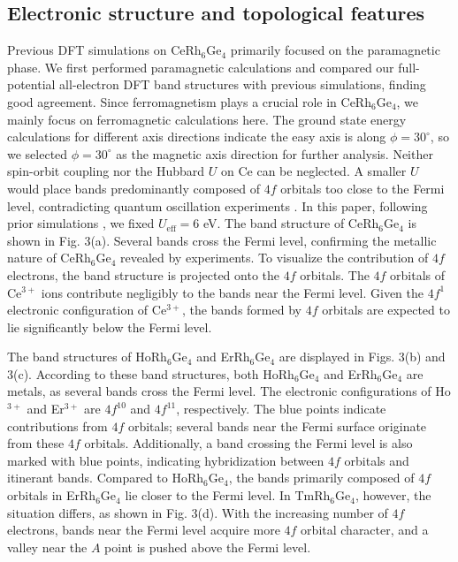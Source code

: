 \documentclass[preprint,12pt]{elsarticle}
\begin{document}
\subsection{Electronic structure and topological features}

Previous DFT simulations on CeRh$_6$Ge$_4$ primarily focused on the paramagnetic phase. We first performed paramagnetic calculations and compared our full-potential all-electron DFT band structures with previous simulations, finding good agreement. Since ferromagnetism plays a crucial role in CeRh$_6$Ge$_4$, we mainly focus on ferromagnetic calculations here. The ground state energy calculations for different axis directions indicate the easy axis is along $\phi = 30^\circ$, so we selected $\phi = 30^\circ$ as the magnetic axis direction for further analysis. Neither spin-orbit coupling nor the Hubbard $U$ on Ce can be neglected. A smaller $U$ would place bands predominantly composed of $4f$ orbitals too close to the Fermi level, contradicting quantum oscillation experiments \cite{wang2021localized}. In this paper, following prior simulations \cite{wu2021anisotropic}, we fixed $U_{\text{eff}} = 6$ eV. The band structure of CeRh$_6$Ge$_4$ is shown in Fig. 3(a). Several bands cross the Fermi level, confirming the metallic nature of CeRh$_6$Ge$_4$ revealed by experiments. To visualize the contribution of $4f$ electrons, the band structure is projected onto the $4f$ orbitals. The $4f$ orbitals of Ce$^{3+}$ ions contribute negligibly to the bands near the Fermi level. Given the $4f^1$ electronic configuration of Ce$^{3+}$, the bands formed by $4f$ orbitals are expected to lie significantly below the Fermi level.

The band structures of HoRh$_6$Ge$_4$ and ErRh$_6$Ge$_4$ are displayed in Figs. 3(b) and 3(c). According to these band structures, both HoRh$_6$Ge$_4$ and ErRh$_6$Ge$_4$ are metals, as several bands cross the Fermi level. The electronic configurations of Ho$^{3+}$ and Er$^{3+}$ are $4f^{10}$ and $4f^{11}$, respectively. The blue points indicate contributions from $4f$ orbitals; several bands near the Fermi surface originate from these $4f$ orbitals. Additionally, a band crossing the Fermi level is also marked with blue points, indicating hybridization between $4f$ orbitals and itinerant bands. Compared to HoRh$_6$Ge$_4$, the bands primarily composed of $4f$ orbitals in ErRh$_6$Ge$_4$ lie closer to the Fermi level. In TmRh$_6$Ge$_4$, however, the situation differs, as shown in Fig. 3(d). With the increasing number of $4f$ electrons, bands near the Fermi level acquire more $4f$ orbital character, and a valley near the $A$ point is pushed above the Fermi level.
\end{document}
